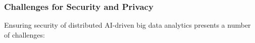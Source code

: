 \documentclass[a4paper,11pt]{article}
\newcommand{\project}[1]{\textbf{#1}\xspace}
\newcommand{\SECURITY}{\project{Elysian}}
\newcommand{\TheProject}{\SECURITY}
\begin{document}




\subsubsection{Challenges for Security and Privacy}

Ensuring security of distributed AI-driven big data analytics presents a number of challenges:
\end{document}
